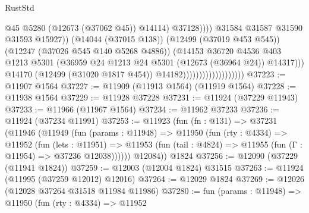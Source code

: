 \begin{lexlean}{RustStd}
\begin{coremodule}
{\begin{coremodule}
{{{{{{{{{{{{{{{{{{{{{{{{{{{{{{{{{{{{{{{{{{{{{{{{{{{{{{{{{{{{{{{{{{{{{{{{{{{{{{{{                                                          @45
                                                          @5280
                                                          (@12673 (@37062 @45))
                                                          @14114)
                                                        @37128))))
                                                @31584
                                                @31587
                                                @31590
                                                @31593
                                                @15927))
                                            (@14044 (@37015 @138))
                                            (@12499 (@37019 @453 @545))
                                            (@12247 (@37026 @545 @140 @5268 @4886))
                                            (@14153
                                              @36720
                                              @4536
                                              @403
                                              @1213
                                              @5301
                                              (@36959
                                                @24
                                                @1213
                                                @24
                                                @5301
                                                (@12673 (@36964 @24))
                                                @14317)))
                                          @14170
                                          (@12499 (@31020 @1817 @454))
                                          @14182)))))))))))))))))))
@37223 := @11907 @1564
@37227 := @11909 (@11913 @1564) (@11919 @1564)
@37228 := @11938 @1564
@37229 := @11928 @37228
@37231 := @11924 (@37229 @11943)
@37233 := @11966 (@11967 @1564)
@37234 := @11962 @37233
@37236 := @11924 (@37234 @11991)
@37253 := @11923
    (fun (fn : @131) =>
    @37231
      (@11946
        (@11949
          (fun (params : @11948) =>
          @11950
            (fun (rty : @4334) =>
            @11952
              (fun (lets : @11951) =>
              @11953 (fun (tail : @4824) => @11955 (fun (Γ : @11954) => @37236 @12038))))))
        @12084))
    @1824
@37256 := @12090 (@37229 (@11941 @1824))
@37259 := @12003 (@12004 @1824) @31515
@37263 := @11924 (@11995 (@37259 @12012) @12016)
@37264 := @12029 @1824
@37269 := @12026 (@12028 @37264 @31518 @11984 @11986)
@37280 := fun (params : @11948) =>
  @11950
    (fun (rty : @4334) =>
    @11952
}}}}}}}}}}}}}}}}}}}}}}}}}}}}}}}}}}}}}}}}}}}}}}}}}}}}}}}}}}}}}}}}}}}}}}}}}}}}}}}}
\end{coremodule}}
\end{coremodule}
\end{lexlean}

